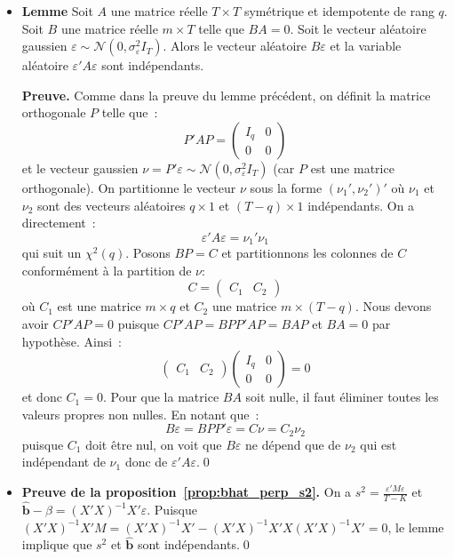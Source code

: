 \documentclass[10pt,a4paper]{article}
\theoremstyle{definition}
\renewcommand{\newline}{\unskip\par\vspace{1.5pt}}
\begin{document}
\begin{notes}

  \begin{itemize}

  \item \textbf{Lemme}
    Soit $A$ une matrice réelle $T\times T$ symétrique et idempotente de rang $q$. Soit $B$ une matrice réelle $m\times T$ telle que $BA=0$. Soit le vecteur aléatoire gaussien $\varepsilon\sim\mathcal N(0, \sigma_{\varepsilon}^2I_T)$. Alors le vecteur aléatoire $B\varepsilon$ et la variable aléatoire $\varepsilon' A \varepsilon$ sont indépendants.\newline

    \textbf{Preuve.} Comme dans la preuve du lemme précédent, on définit la matrice orthogonale $P$ telle que~:
    \[
      P'AP =
      \begin{pmatrix}
        I_q & 0\\
        0   & 0
      \end{pmatrix}
    \]
    et le vecteur gaussien $\nu = P'\varepsilon\sim\mathcal N\left(0, \sigma_{\varepsilon}^2I_T\right)$ (car $P$ est une matrice orthogonale). On partitionne le vecteur $\nu$ sous la forme $(\nu_1',\nu_2')'$ où $\nu_1$ et $\nu_2$ sont des vecteurs aléatoires $q\times 1$ et $(T-q)\times 1$ indépendants. On a directement~:
    \[
      \varepsilon' A \varepsilon = \nu_1'\nu_1
    \]
    qui suit un $\chi^2(q)$. Posons $BP = C$ et partitionnons les colonnes de $C$ conformément à la partition de $\nu$:
    \[
      C =
      \begin{pmatrix}
        C_1 & C_2
      \end{pmatrix}
    \]
    où $C_1$ est une matrice $m\times q$ et $C_2$ une matrice $m\times(T-q)$. Nous devons avoir $C P' A P = 0$ puisque $CP'AP = BPP'AP = BAP$ et $BA = 0$ par hypothèse. Ainsi~:
    \[
      \begin{pmatrix}
        C_1 & C_2
      \end{pmatrix}
      \begin{pmatrix}
        I_q & 0\\
        0   & 0
      \end{pmatrix}
      = 0
    \]
    et donc $C_1=0$. Pour que la matrice $BA$ soit nulle, il faut éliminer toutes les valeurs propres non nulles. En notant que~:
    \[
      B\varepsilon = BPP'\varepsilon = C\nu = C_2\nu_2
    \]
    puisque $C_1$ doit être nul, on voit que $B\varepsilon$ ne dépend que de $\nu_2$ qui est indépendant de $\nu_1$ donc de $\varepsilon' A \varepsilon$.\qed\newline

  \item \textbf{Preuve de la proposition~\ref{prop:bhat_perp_s2}.} On
    a $s^2=\frac{\varepsilon' M \varepsilon}{T-K}$
    et
    $\hat{\mathbf b}-\beta = (X'X)^{-1}X'\varepsilon$. Puisque
    $(X'X)^{-1}X'M = (X'X)^{-1}X'-(X'X)^{-1}X'X(X'X)^{-1}X'=0$, le
    lemme implique que $s^2$ et $\hat{\mathbf b}$ sont indépendants.\qed


  \end{itemize}

\end{notes}
\end{document}
